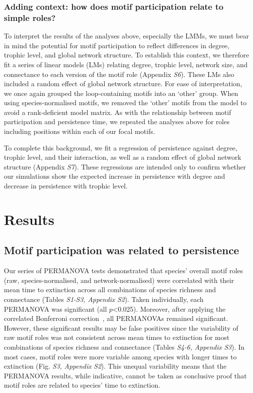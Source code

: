 \documentclass[12pt]{article}
\begin{document}
\begin{spacing}{2.0}
        \subsubsection*{Adding context: how does motif participation relate to simple roles?}

            To interpret the results of the analyses above, especially the LMMs, we must bear in mind the potential for motif participation to reflect differences in degree, trophic level, and global network structure. 
            To establish this context, we therefore fit a series of linear models (LMs) relating degree, trophic level, network size, and connectance to each version of the motif role (Appendix \emph{S6}). 
            These LMs also included a random effect of global network structure.
            For ease of interpretation, we once again grouped the loop-containing motifs into an `other' group. 
            When using species-normalised motifs, we removed the `other' motifs from the model to avoid a rank-deficient model matrix.
            As with the relationship between motif participation and persistence time, we repeated the analyses above for roles including positions within each of our focal motifs.
            
            
            To complete this background, we fit a regression of persistence against degree, trophic level, and their interaction, as well as a random effect of global network structure (Appendix \emph{S7}). 
            These regressions are intended only to confirm whether our simulations show the expected increase in persistence with degree and decrease in persistence with trophic level. 


\section*{Results}
	
    \subsection*{Motif participation was related to persistence}
    
		Our series of PERMANOVA tests demonstrated that species' overall motif roles (raw, species-normalised, and network-normalised) were correlated with their mean time to extinction across all combinations of species richness and connectance (Tables \emph{S1-S3, Appendix S2}). 
        Taken individually, each PERMANOVA was significant (all $p$\textless0.025). Moreover, after applying the correlated Bonferroni correction~\citep{Drezner2016}, all PERMANOVAs remained significant.
		However, these significant results may be false positives since the variability of raw motif roles was not consistent across mean times to extinction for most combinations of species richness and connectance (Tables \emph{S4-6, Appendix S3}). 
        In most cases, motif roles were more variable among species with longer times to extinction (Fig. \emph{S3, Appendix S2}).
        This unequal variability means that the PERMANOVA results, while indicative, cannot be taken as conclusive proof that motif roles are related to species' time to extinction.
    


\end{spacing}
\end{document}
